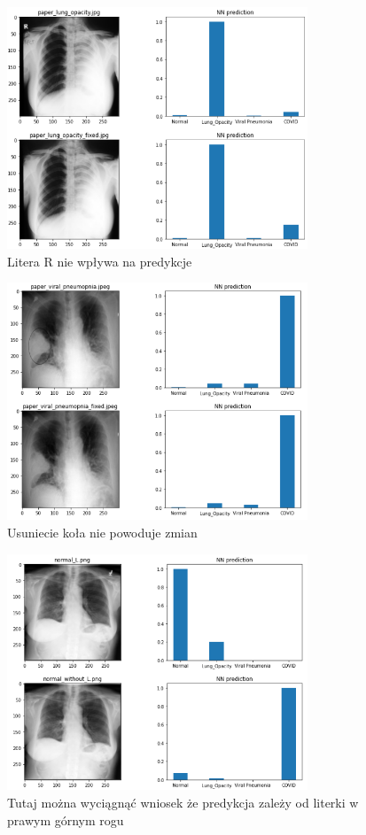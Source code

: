 \documentclass{article}
\begin{document}
\begin{figure}[H]
	\centering
	\includegraphics[width=0.8\textwidth,keepaspectratio=true]{paper_l_o_exp}
	\caption{Litera R nie wpływa na predykcje}
	\label{}
\end{figure}

\begin{figure}[H]
	\centering
	\includegraphics[width=0.8\textwidth,keepaspectratio=true]{paper_v_p_exp}
	\caption{Usuniecie koła nie powoduje zmian}
	\label{}
\end{figure}

\begin{figure}[H]
	\centering
	\includegraphics[width=0.8\textwidth,keepaspectratio=true]{normal_L_exp}
	\caption{Tutaj można wyciągnąć wniosek że predykcja zależy od literki w prawym górnym rogu}
	\label{}
\end{figure}
\end{document}
